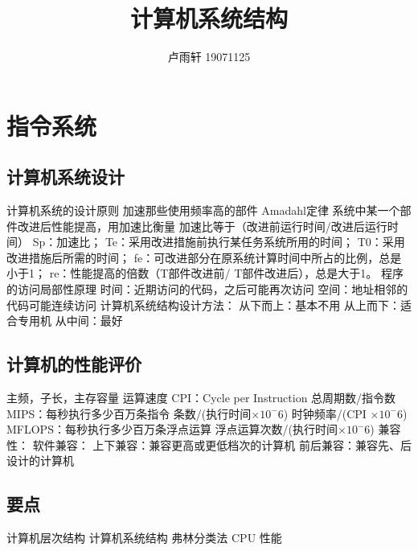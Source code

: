 \documentclass{ctexart}
\title{计算机系统结构}
\author{卢雨轩 19071125}
\begin{document}
\maketitle
\tableofcontents

\section{指令系统}
\subsection{计算机系统设计}
\begin{outline}
    \1 计算机系统的设计原则
        \2 加速那些使用频率高的部件
        \2 Amadahl定律
            \3 系统中某一个部件改进后性能提高，用加速比衡量
            \3 加速比等于（改进前运行时间/改进后运行时间）
            \3 Sp：加速比；
            \3 Te：采用改进措施前执行某任务系统所用的时间；
            \3 T0：采用改进措施后所需的时间；
            \3 fe：可改进部分在原系统计算时间中所占的比例，总是小于1；
            \3 re：性能提高的倍数（T部件改进前/ T部件改进后），总是大于1。
        \2 程序的访问局部性原理
            \3 时间：近期访问的代码，之后可能再次访问
            \3 空间：地址相邻的代码可能连续访问
    \1 计算机系统结构设计方法：
        \2 从下而上：基本不用
        \2 从上而下：适合专用机
        \3 从中间：最好
\end{outline}
\subsection{计算机的性能评价}
\begin{outline}
    \1 主频，子长，主存容量
    \1 运算速度
        \2 CPI：Cycle per Instruction
            \3 总周期数/指令数
        \2 MIPS：每秒执行多少百万条指令
            \3 条数/(执行时间$\times 10^-6$)
            \3 时钟频率/(CPI $\times 10^-6$)
        \2 MFLOPS：每秒执行多少百万条浮点运算
            \3 浮点运算次数/(执行时间$\times 10^-6$)
    \1 兼容性：
        \2 软件兼容：
        \3 上下兼容：兼容更高或更低档次的计算机
        \3 前后兼容：兼容先、后设计的计算机
\end{outline}
\subsection{要点}
\begin{outline}
    \heiti
    \1 计算机层次结构
    \1 计算机系统结构
    \1 弗林分类法
    \1 CPU 性能
\end{outline}
\end{document}
